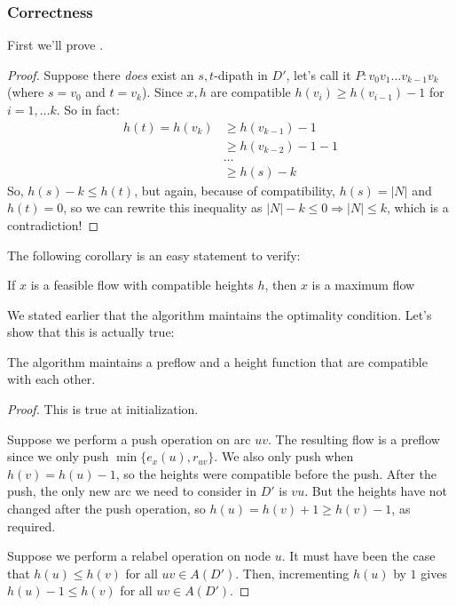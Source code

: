 \subsubsection{Correctness}
First we'll prove .
\begin{proof}
    Suppose there \textit{does} exist an $s,t$-dipath in $D'$, let's call it $P : v_0v_1\ldots v_{k-1}v_k$ (where $s = v_0$ and $t = v_k$). Since $x, h$ are compatible $h(v_i) \geq h(v_{i-1}) - 1$ for $i = 1, \ldots k$. So in fact:
    \begin{align*}
        h(t) = h(v_k) &\geq h(v_{k-1}) - 1 \\
        &\geq h(v_{k-2}) - 1 - 1 \\
        &\ldots \\
        &\geq h(s) - k
    \end{align*}
    So, $h(s) - k \leq h(t)$, but again, because of compatibility, $h(s) = |N|$ and $h(t) = 0$, so we can rewrite this inequality as $|N| - k \leq 0 \Rightarrow |N| \leq k$, which is a contradiction! 
\end{proof}

The following corollary is an easy statement to verify:
\begin{corollary}{}{}
    If $x$ is a feasible flow with compatible heights $h$, then $x$ is a maximum flow
\end{corollary}

We stated earlier that the algorithm maintains the optimality condition. Let's show that this is actually true:
\begin{theorem}{}{}
    The algorithm maintains a preflow and a height function that are compatible with each other.
\end{theorem}
\begin{proof}
    This is true at initialization.

    Suppose we perform a push operation on arc $uv$. 
    The resulting flow is a preflow since we only push $\min\{e_x(u), r_{uv}\}$. 
    We also only push when $h(v) = h(u) - 1$, so the heights were compatible before the push. 
    After the push, the only new arc we need to consider in $D'$ is $vu$. 
    But the heights have not changed after the push operation, so $h(u) = h(v) + 1 \geq h(v) - 1$, as required.
    
    Suppose we perform a relabel operation on node $u$.
    It must have been the case that $h(u) \leq h(v)$ for all $uv \in A(D')$.
    Then, incrementing $h(u)$ by $1$ gives $h(u) - 1 \leq h(v)$ for all $uv \in A(D')$.
\end{proof}

